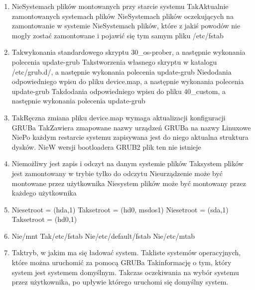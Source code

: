 \begin{enumerate}
	\item {}
	{Nie}{Systemach plików montowanych przy starcie systemu}
	{Tak}{Aktualnie zamontowanych systemach plików}
	{Nie}{Systemach plików oczekujących na zamontowanie w systemie}
	{Nie}{Systemach plików, które z jakiś powodów nie mogły zostać zamontowane i pojawić się tym samym pliku /etc/fstab}
	
	\newpage
	
	\item {}
	{Tak}{wykonania standardowego skryptu 30\_os-prober, a następnie wykonania polecenia update-grub}
	{Tak}{stworzenia własnego skryptu w katalogu /etc/grub.d/, a następnie wykonania polecenia update-grub}
	{Nie}{dodania odpowiedniego wpisu do pliku device.map, a następnie wykonania polecenia update-grub}
	{Tak}{dodania odpowiedniego wpisu do pliku 40\_custom, a następnie wykonania polecenia update-grub}
	
	\item {}
	{Tak}{Ręczna zmiana pliku device.map wymaga aktualizacji konfiguracji GRUBa}
	{Tak}{Zawiera zmapowane nazwy urządzeń GRUBa na nazwy Linuxowe}
	{Nie}{Po każdym restarcie systemu zapisywana jest do niego aktualna struktura dysków.}
	{Nie}{W wersji bootloadera GRUB2 plik ten nie istnieje}
	
	\item {}
	{Nie}{możliwy jest zapis i odczyt na danym systemie plików}
	{Tak}{system plików jest zamontowany w trybie tylko do odczytu}
	{Nie}{urządzenie może być montowane przez użytkownika}
	{Nie}{system plików może być montowany przez każdego użytkownika}
	
	\item {}
	{Nie}{setroot = (hda,1)}
	{Tak}{setroot = (hd0, msdos1)}
	{Nie}{setroot = (sda,1)}
	{Tak}{setroot = (hd0,1)}
	
	\item {}
	{Nie}{/mnt}
	{Tak}{/etc/fstab}
	{Nie}{/etc/default/fstab}
	{Nie}{/etc/mtab}
	
	\item {}
	{Tak}{tryb, w jakim ma się ładować system.}
	{Tak}{liste systemów operacyjnych, które można uruchomić za pomocą GRUBa}
	{Tak}{informację o tym, który system jest systemem domyślnym.}
	{Tak}{czas oczekiwania na wybór systemu przez użytkownika, po upływie którego uruchomi się domyślny system.}
	

\end{enumerate}
